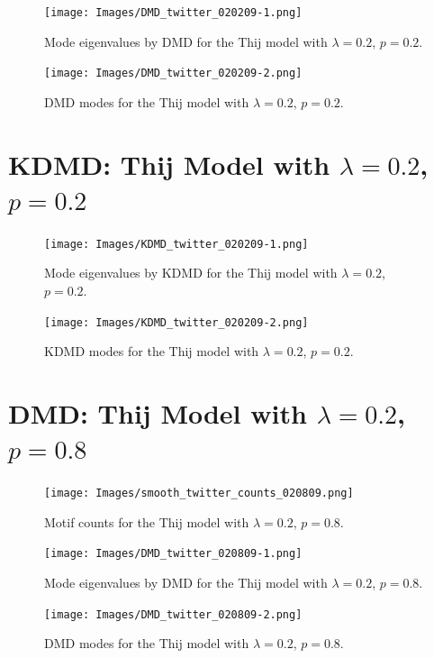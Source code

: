 \clearpage

\begin{figure}
    \texttt{[image: Images/DMD\_twitter\_020209-1.png]}
    \centering
    \caption{Mode eigenvalues by DMD for the Thij model
    with $\lambda=0.2$, $p=0.2$.}
\end{figure}

\begin{figure}
    \texttt{[image: Images/DMD\_twitter\_020209-2.png]}
    \centering
    \caption{DMD modes for the Thij model
    with $\lambda=0.2$, $p=0.2$.}
\end{figure}

\clearpage

\section{KDMD: Thij Model with $\lambda=0.2$, $p=0.2$}

\FloatBarrier


\begin{figure}
    \texttt{[image: Images/KDMD\_twitter\_020209-1.png]}
    \centering
    \caption{Mode eigenvalues by KDMD for the Thij model
    with $\lambda=0.2$, $p=0.2$.}
\end{figure}

\begin{figure}
    \texttt{[image: Images/KDMD\_twitter\_020209-2.png]}
    \centering
    \caption{KDMD modes for the Thij model
    with $\lambda=0.2$, $p=0.2$.}
\end{figure}

\clearpage
\FloatBarrier
\section{DMD: Thij Model with $\lambda=0.2$, $p=0.8$}
\begin{figure}
    \texttt{[image: Images/smooth\_twitter\_counts\_020809.png]}
    \centering
    \caption{Motif counts for the Thij model with $\lambda=0.2$, $p=0.8$.}
    \label{fig:pthij0208}
\end{figure}

\clearpage
\begin{figure}
    \texttt{[image: Images/DMD\_twitter\_020809-1.png]}
    \centering
    \caption{Mode eigenvalues by DMD for the Thij model
    with $\lambda=0.2$, $p=0.8$.}
    \label{fig:dmd02081}
\end{figure}

\begin{figure}
    \texttt{[image: Images/DMD\_twitter\_020809-2.png]}
    \centering
    \caption{DMD modes for the Thij model
    with $\lambda=0.2$, $p=0.8$.}
    \label{fig:dmd02082}
\end{figure}

